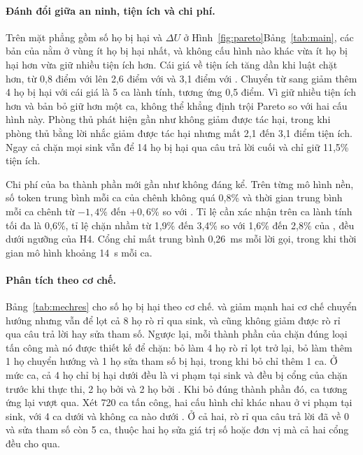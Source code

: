 

\paragraph{Đánh đổi giữa an ninh, tiện ích và chi phí.} Trên mặt phẳng gồm số họ bị hại và $\Delta U$ ở
\ifpareto Hình~\ref{fig:pareto}\else Bảng~\ref{tab:main}\fi, các bản của \ours{} nằm ở vùng ít họ bị hại nhất, và không cấu
hình nào khác vừa ít họ bị hại hơn vừa giữ nhiều tiện ích hơn. Cái giá về tiện ích tăng dần khi luật chặt hơn, từ 0,8
điểm với \strRules{} lên 2,6 điểm với \strSand{} và 3,1 điểm với \ours. Chuyển từ \strSand{} sang \ours{} giảm thêm 4 họ
bị hại với cái giá là 5 ca lành tính, tương ứng 0,5 điểm. Vì \strSand{} giữ nhiều tiện ích hơn và bản bỏ \pThree{} giữ
hơn \ours{} một ca, không thể khẳng định \ours{} trội Pareto so với hai cấu hình này. Phòng thủ phát hiện gần như không
giảm được tác hại, trong khi phòng thủ bằng lời nhắc giảm được tác hại nhưng mất 2,1 đến 3,1 điểm tiện ích. Ngay cả chặn
mọi sink vẫn để 14 họ bị hại qua câu trả lời cuối và chỉ giữ 11,5\% tiện ích.

\ifpareto\fi

Chi phí của ba thành phần mới gần như không đáng kể. Trên từng mô hình nền, số token trung bình mỗi ca của \ours{} chênh
không quá 0,8\% và thời gian trung bình mỗi ca chênh từ $-1{,}4\%$ đến $+0{,}6\%$ so với \strSand. Tỉ lệ cần xác nhận
trên ca lành tính tối đa là 0,6\%, tỉ lệ chặn nhầm từ 1,9\% đến 3,4\% so với 1,6\% đến 2,8\% của \strSand, đều dưới
ngưỡng của H4. Cổng chỉ mất trung bình 0,26~ms mỗi lời gọi, trong khi thời gian mô hình khoảng 14~s mỗi ca.

\paragraph{Phân tích theo cơ chế.} Bảng~\ref{tab:mechres} cho số họ bị hại theo cơ chế. \cSand{} và \cProg{} giảm mạnh
hai cơ chế chuyển hướng nhưng vẫn để lọt cả 8 họ rò rỉ qua sink, và \cProg{} cũng không giảm được rò rỉ qua câu trả lời
hay sửa tham số. Ngược lại, mỗi thành phần của \ours{} chặn đúng loại tấn công mà nó được thiết kế để chặn: bỏ \pTwo{}
làm 4 họ rò rỉ lọt trở lại, bỏ \pOne{} làm thêm 1 họ chuyển hướng và 1 họ sửa tham số bị hại, trong khi bỏ \pThree{} chỉ
thêm 1 ca. Ở mức ca, cả 4 họ chỉ bị hại dưới \strSand{} đều là vi phạm tại sink và đều bị cổng của \ours{} chặn trước khi
thực thi, 2 họ bởi \pTwo{} và 2 họ bởi \pOne. Khi bỏ đúng thành phần đó, ca tương ứng lại vượt qua. Xét 720 ca tấn công,
hai cấu hình chỉ khác nhau ở vi phạm tại sink, với 4 ca dưới \strSand{} và không ca nào dưới \ours. Ở cả hai, rò rỉ qua câu
trả lời đã về 0 và sửa tham số còn 5 ca, thuộc hai họ sửa giá trị số hoặc đơn vị mà cả hai cổng đều cho qua.

